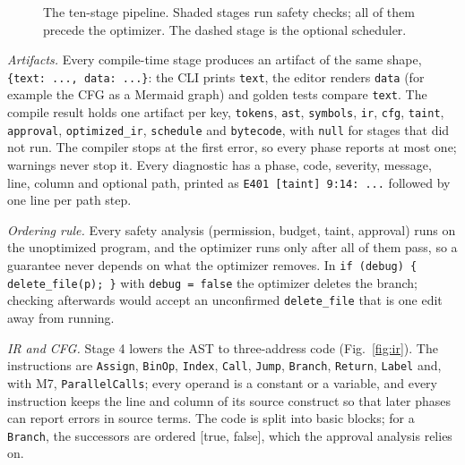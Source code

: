 \documentclass[conference]{IEEEtran}
\begin{document}
\begin{figure}[!t]
\caption{The ten-stage pipeline. Shaded stages run safety checks; all of them precede the optimizer. The dashed stage is the optional scheduler.}
\label{fig:pipeline}
\end{figure}

\emph{Artifacts.} Every compile-time stage produces an artifact of the same shape, \texttt{\{\textquotedbl{}text\textquotedbl{}: ...,\allowbreak{} \textquotedbl{}data\textquotedbl{}: ...\}}: the CLI prints \texttt{text}, the editor renders \texttt{data} (for example the CFG as a Mermaid graph) and golden tests compare \texttt{text}. The compile result holds one artifact per key, \texttt{tokens}, \texttt{ast}, \texttt{symbols}, \texttt{ir}, \texttt{cfg}, \texttt{taint}, \texttt{approval}, \texttt{optimized\_ir}, \texttt{schedule} and \texttt{bytecode}, with \texttt{null} for stages that did not run. The compiler stops at the first error, so every phase reports at most one; warnings never stop it. Every diagnostic has a phase, code, severity, message, line, column and optional path, printed as \texttt{E401 [taint] 9:14: ...} followed by one line per path step.

\emph{Ordering rule.} Every safety analysis (permission, budget, taint, approval) runs on the unoptimized program, and the optimizer runs only after all of them pass, so a guarantee never depends on what the optimizer removes. In \texttt{if (debug) \{ delete\_file(p); \}} with \texttt{debug = false} the optimizer deletes the branch; checking afterwards would accept an unconfirmed \texttt{delete\_file} that is one edit away from running.

\emph{IR and CFG.} Stage 4 lowers the AST to three-address code (Fig.~\ref{fig:ir}). The instructions are \texttt{Assign}, \texttt{BinOp}, \texttt{Index}, \texttt{Call}, \texttt{Jump}, \texttt{Branch}, \texttt{Return}, \texttt{Label} and, with M7, \texttt{ParallelCalls}; every operand is a constant or a variable, and every instruction keeps the line and column of its source construct so that later phases can report errors in source terms. The code is split into basic blocks; for a \texttt{Branch}, the successors are ordered [true, false], which the approval analysis relies on.
\end{document}
